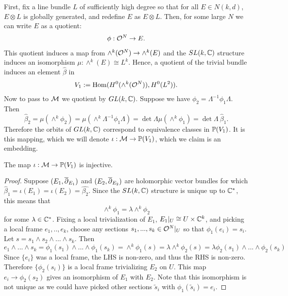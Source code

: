 	First, fix a line bundle $L$ of sufficiently high degree so that for all $E\in N(k,d)$, $E\otimes L$  is globally generated, and redefine $E$ as $E\otimes L$. Then, for some large $N$ we can write $E$ as a quotient:
	\begin{equation}
	\phi:\mathcal{O}^N \to E.
	\end{equation}
	This quotient induces a map from $\wedge^k(\mathcal{O}^N) \to \wedge^k(E)$ and the $SL(k,\mathbb{C})$ structure induces an isomorphism $\mu:\wedge^k(E)\cong L^k$. Hence, a quotient of the trivial bundle induces an element $\hat{\beta}$ in 
	\begin{equation}
	V_1 := \text{Hom}(H^0(\wedge^k(\mathcal{O}^N)), H^0(L^2)).
	\end{equation}
	Now to pass to $\mathcal{M}$ we quotient by $GL(k,\mathbb{C})$. Suppose we have $\phi_2 = \Lambda^{-1} \phi_1 \Lambda$. Then
	\begin{equation}
		\hat{\beta}_2 = \mu(\wedge^k \phi_2) = \mu(\wedge^k \Lambda^{-1}\phi_1 \Lambda) = \det\Lambda \mu(\wedge^k \phi_1) = \det\Lambda~ \hat{\beta}_1.
	\end{equation}
	Therefore the orbits of $GL(k,\mathbb{C})$ correspond to equivalence classes in $\mathbb{P}(V_1)$. It is this mapping, which we will denote $\iota:\mathcal{M}\to \mathbb{P}(V_1)$, which we claim is an embedding. 
	\begin{lemma}
		The map $\iota:\mathcal{M} \to \mathbb{P}(V_1)$ is injective.
	\end{lemma}
	\begin{proof}
		 Suppose $(E_1, \overline{\partial}_{E_1})$ and $(E_2, \overline{\partial}_{E_2})$ are holomorphic vector bundles for which $\hat{\beta}_1 = \iota(E_1) = \iota(E_2) = \hat{\beta_2}$. Since the $SL(k,\mathbb{C})$ structure is unique up to $\mathbb{C}^\ast$, this means that
		\begin{equation}
		\wedge^k \phi_1 = \lambda \wedge^k \phi_2
		\end{equation}
		for some $\lambda \in \mathbb{C}^\ast$. Fixing a local trivialization of $E_1$, $E_1|_U \cong U\times \mathbb{C}^k$, and picking a local frame $e_1,..,e_k$, choose any sections $s_1,...,s_k \in \mathcal{O}^N|_{U}$ so that $\phi_1(e_i) = s_i$. Let $s = s_1 \wedge s_2 \wedge ... \wedge s_k$. Then
		\begin{equation}
		e_1\wedge...\wedge s_k=\phi_1(s_1)\wedge...\wedge \phi_1(s_k)= \wedge^k \phi_1(s) = \lambda \wedge^k \phi_2(s) = \lambda \phi_2(s_1)\wedge...\wedge \phi_2(s_k)
		\end{equation}
		Since $\{e_i\}$ was a local frame, the LHS is non-zero, and thus the RHS is non-zero. Therefore $\{\phi_2(s_i)\}$ is a local frame trivializing $E_2$ on $U$. This map $e_i \to \phi_2(s_2)$ gives an isomorphism of $E_1$ with $E_2$. Note that this isomorphism is not unique as we could have picked other sections $\tilde{s}_i$ with $\phi_1(\tilde{s}_i) = e_i$.
	\end{proof}
